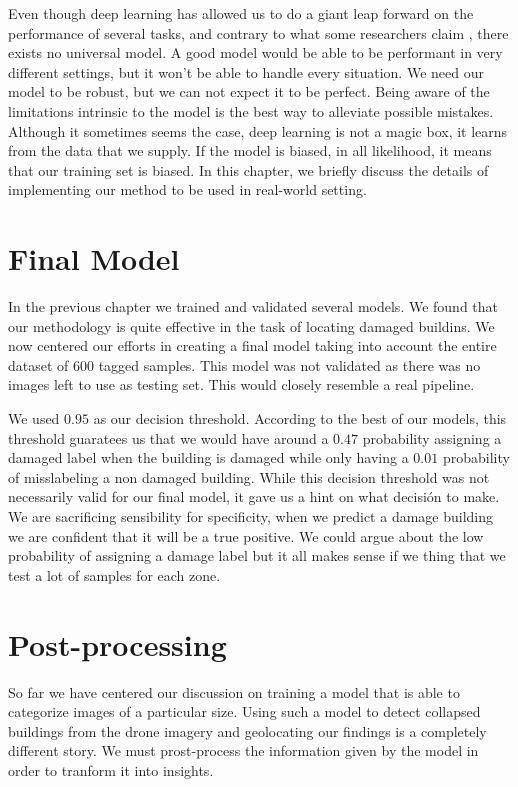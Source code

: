 Even though deep learning has allowed us to do a giant leap forward on the performance of several tasks, and contrary to what some researchers claim \cite{DBLP:journals/corr/KaiserGSVPJU17}, there exists no universal model. A good model would be able to be performant in very different settings, but it won't be able to handle every situation. We need our model to be robust, but we can not expect it to be perfect. Being aware of the limitations intrinsic to the model is the best way to alleviate possible mistakes. Although it sometimes seems the case, deep learning is not a magic box, it learns from the data that we supply. If the model is biased, in all likelihood, it means that our training set is biased. In this chapter, we briefly discuss the details of implementing our method to be used in real-world setting.\\

\section{Final Model}

In the previous chapter we trained and validated several models. We found that our methodology is quite effective in the task of locating damaged buildins. We now centered our efforts in creating a final model taking into account the entire dataset of 600 tagged samples. This model was not validated as there was no images left to use as testing set. This would closely resemble a real pipeline.

We used $0.95$ as our decision threshold. According to the best of our models, this threshold guaratees us that we would have around a $0.47$ probability assigning a damaged label when the building is damaged while only having a $0.01$ probability of misslabeling a non damaged building. While this decision threshold was not necessarily valid for our final model, it gave us a hint on what decisión to make. We are sacrificing sensibility for specificity, when we predict a damage building we are confident that it will be a true positive. We could argue about the low probability of assigning a damage label but it all makes sense if we thing that we test a lot of samples for each zone.


\section{Post-processing}

So far we have centered our discussion on training a model that is able to categorize images of a particular size. Using such a model to detect collapsed buildings from the drone imagery and geolocating our findings is a completely different story. We must prost-process the information given by the model in order to tranform it into insights.

